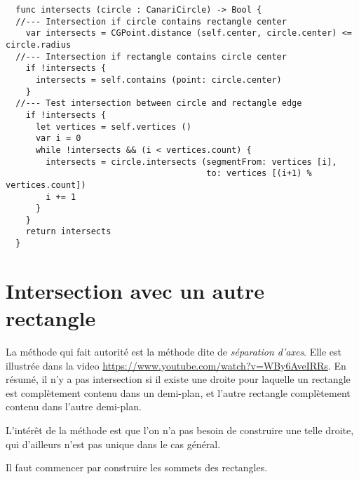 \begin{lstlisting}
  func intersects (circle : CanariCircle) -> Bool {
  //--- Intersection if circle contains rectangle center
    var intersects = CGPoint.distance (self.center, circle.center) <= circle.radius
  //--- Intersection if rectangle contains circle center
    if !intersects {
      intersects = self.contains (point: circle.center)
    }
  //--- Test intersection between circle and rectangle edge
    if !intersects {
      let vertices = self.vertices ()
      var i = 0
      while !intersects && (i < vertices.count) {
        intersects = circle.intersects (segmentFrom: vertices [i],
                                        to: vertices [(i+1) % vertices.count])
        i += 1
      }
    }
    return intersects
  }
\end{lstlisting}






\section{Intersection avec un autre rectangle}

La méthode qui fait autorité est la méthode dite de \emph{séparation d'axes}. Elle est illustrée dans la video \url{https://www.youtube.com/watch?v=WBy6AveIRRs}. En résumé, il n'y a pas intersection si il existe une droite pour laquelle un rectangle est complètement contenu dans un demi-plan, et l'autre rectangle complètement contenu dans l'autre demi-plan.

\begin{center}
\end{center}

L'intérêt de la méthode est que l'on n'a pas besoin de construire une telle droite, qui d'ailleurs n'est pas unique dans le cas général.

Il faut commencer par construire les sommets des rectangles.

